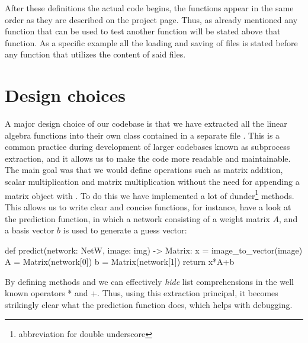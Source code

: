 \documentclass[a4paper,oneside,article,english]{memoir}
\begin{document}
After these definitions the actual code begins, the functions appear in the same
order as they are described on the project page. Thus, as already mentioned any
function that can be used to test another function will be stated above that
function. As a specific example all the loading and saving of files is stated
before any function that utilizes the content of said files.

\section{Design choices}  
\label{sec:design_choices}

A major design choice of our codebase is that we have extracted all the linear
algebra functions into their own class contained in a separate file
. This is a common practice during development of larger
codebases known as subprocess extraction, and it allows us to make the code more
readable and maintainable. The main goal was that we would define operations
such as matrix addition, scalar multiplication and matrix multiplication without
the need for appending a matrix object with .
To do this we have implemented a lot of dunder\footnote{abbreviation for double
underscore} methods. This allows us to write clear and concise functions, for
instance, have a look at the prediction function, in which a network consisting
of a weight matrix $A$, and a basis vector $b$ is used to generate a guess
vector:
\begin{python}
def predict(network: NetW, image: img) -> Matrix:
  x = image_to_vector(image)
  A = Matrix(network[0])
  b = Matrix(network[1])
  return x*A+b
\end{python}
By defining methods  and  we can
effectively \emph{hide} list comprehensions in the well known operators * and
+. Thus, using this extraction principal, it becomes strikingly clear what the
prediction function does, which helps with debugging. 
\end{document}
